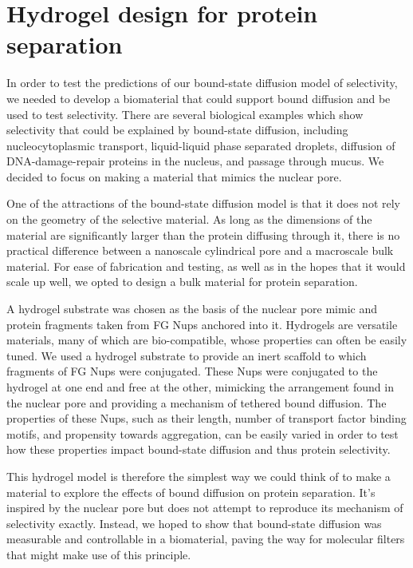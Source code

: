 \chapter{Hydrogel design for protein separation}\label{ch03}

In order to test the predictions of our bound-state diffusion model of selectivity, we needed to develop a biomaterial that could support bound diffusion and be used to test selectivity.  There are several biological examples which show selectivity that could be explained by bound-state diffusion, including nucleocytoplasmic transport, liquid-liquid phase separated droplets, diffusion of DNA-damage-repair proteins in the nucleus, and passage through mucus.  We decided to focus on making a material that mimics the nuclear pore.

One of the attractions of the bound-state diffusion model is that it does not rely on the geometry of the selective material.  As long as the dimensions of the material are significantly larger than the protein diffusing through it, there is no practical difference between a nanoscale cylindrical pore and a macroscale bulk material.  For ease of fabrication and testing, as well as in the hopes that it would scale up well, we opted to design a bulk material for protein separation.

A hydrogel substrate was chosen as the basis of the nuclear pore mimic and protein fragments taken from FG Nups anchored into it.  Hydrogels are versatile materials, many of which are bio-compatible, whose properties can often be easily tuned.  We used a hydrogel substrate to provide an inert scaffold to which fragments of FG Nups were conjugated.  These Nups were conjugated to the hydrogel at one end and free at the other, mimicking the arrangement found in the nuclear pore and providing a mechanism of tethered bound diffusion.  The properties of these Nups, such as their length, number of transport factor binding motifs, and propensity towards aggregation, can be easily varied in order to test how these properties impact bound-state diffusion and thus protein selectivity.

This hydrogel model is therefore the simplest way we could think of to make a material to explore the effects of bound diffusion on protein separation.  It's inspired by the nuclear pore but does not attempt to reproduce its mechanism of selectivity exactly.  Instead, we hoped to show that bound-state diffusion was measurable and controllable in a biomaterial, paving the way for molecular filters that might make use of this principle.

